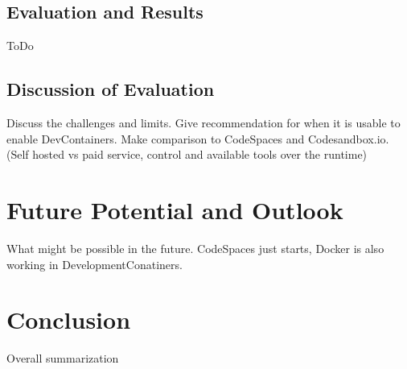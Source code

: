 \documentclass[12pt, a4paper]{article}
\begin{document}
    \subsection{Evaluation and Results}
    ToDo
    \subsection{Discussion of Evaluation}
    Discuss the challenges and limits. Give recommendation for when it is usable to enable DevContainers. Make comparison to CodeSpaces and Codesandbox.io. (Self hosted vs paid service, control and available tools over the runtime)

\section{Future Potential and Outlook}\label{sec::outlook}
What might be possible in the future. CodeSpaces just starts, Docker is also working in DevelopmentConatiners.
\section{Conclusion}\label{sec::conclusion}
Overall summarization

\newpage
\renewcommand{\thesubsection}{\Alph{subsection}}
\setcounter{page}{\value{lastroman}}

% 

% 



% 
% 
% 
\end{document}

